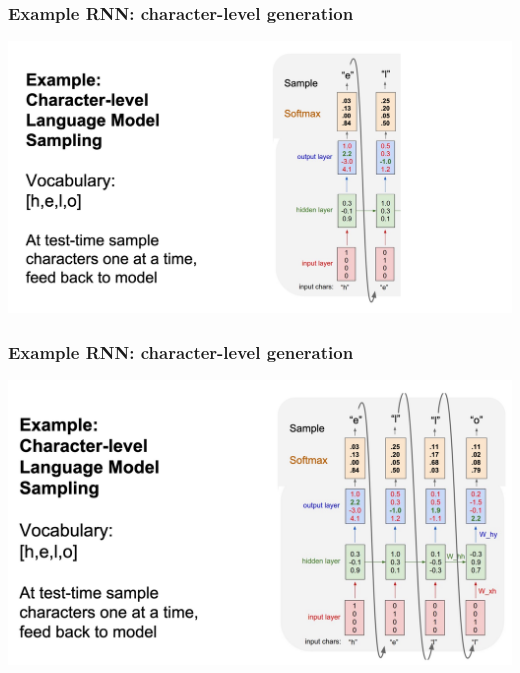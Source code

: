 \documentclass[aspectratio=1610]{beamer} %
\begin{document}
\begin{frame}

\frametitle{Example RNN: character-level generation}

\begin{center}
\includegraphics[width=\textwidth]{pics/example6}
\end{center}

\end{frame}

\begin{frame}

\frametitle{Example RNN: character-level generation}

\begin{center}
\includegraphics[width=.9\textwidth]{pics/example7}
\end{center}

\end{frame}
\end{document}
